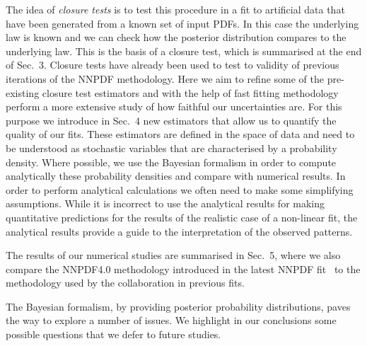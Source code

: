 The idea of {\em closure tests} is to test this procedure in a fit to artificial
data that have been generated from a known set of input PDFs. In this case the
underlying law is known and we can check how the posterior distribution compares
to the underlying law. This is the basis of a closure test, which is summarised
at the end of Sec.~3. Closure tests have already been used to test to validity
of previous iterations of the NNPDF methodology. Here we aim to refine some of
the pre-existing closure test estimators and with the help of fast fitting
methodology perform a more extensive study of how faithful our uncertainties
are. For this purpose we introduce in Sec.~4 new estimators that allow us to
quantify the quality of our fits. These estimators are defined in the space of
data and need to be understood as stochastic variables that are characterised by
a probability density. Where possible, we use the Bayesian formalism in order to
compute analytically these probability densities and compare with numerical
results. In order to perform analytical calculations we often need to make some
simplifying assumptions. While it is incorrect to use the analytical results for
making quantitative predictions for the results of the realistic case of a
non-linear fit, the analytical results provide a guide to the interpretation of
the observed patterns. 

The results of our numerical studies are summarised in Sec.~5, where we also
compare the NNPDF4.0 methodology introduced in the latest NNPDF
fit~\cite{NNPDF40} to the methodology used by the collaboration in previous
fits. 
 
The Bayesian formalism, by providing posterior probability distributions, paves
the way to explore a number of issues. We highlight in our conclusions some
possible questions that we defer to future studies. 